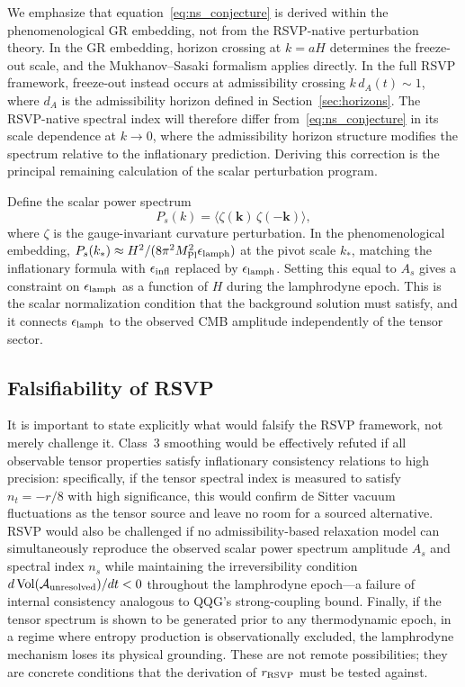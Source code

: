 \documentclass[12pt, a4paper]{article}
\newcommand{\calA}{\mathcal{A}}
\newcommand{\epslamph}{\epsilon_{\rm lamph}}
\newcommand{\rRSVP}{r_{\rm RSVP}}
\newcommand{\Vol}{\operatorname{Vol}}
\begin{document}
We emphasize that equation~\eqref{eq:ns_conjecture} is derived within the
phenomenological GR embedding, not from the RSVP-native perturbation theory. In
the GR embedding, horizon crossing at $k = aH$ determines the freeze-out scale,
and the Mukhanov--Sasaki formalism applies directly. In the full RSVP framework,
freeze-out instead occurs at admissibility crossing $k\,d_A(t) \sim 1$, where
$d_A$ is the admissibility horizon defined in Section~\ref{sec:horizons}. The
RSVP-native spectral index will therefore differ from~\eqref{eq:ns_conjecture}
in its scale dependence at $k \to 0$, where the admissibility horizon structure
modifies the spectrum relative to the inflationary prediction. Deriving this
correction is the principal remaining calculation of the scalar perturbation
program.

Define the scalar power spectrum
\begin{equation}
P_s(k) = \langle \zeta(\mathbf{k})\,\zeta(-\mathbf{k})\rangle,
\end{equation}
where $\zeta$ is the gauge-invariant curvature perturbation. In the
phenomenological embedding, $P_s(k_*) \approx H^2/(8\pi^2 M_{\rm Pl}^2
\epslamph)$ at the pivot scale $k_*$, matching the inflationary formula with
$\epsilon_{\rm infl}$ replaced by $\epslamph$. Setting this equal to $A_s$ gives
a constraint on $\epslamph$ as a function of $H$ during the lamphrodyne epoch.
This is the scalar normalization condition that the background solution must
satisfy, and it connects $\epslamph$ to the observed CMB amplitude independently
of the tensor sector.

\subsection{Falsifiability of RSVP}

It is important to state explicitly what would falsify the RSVP framework, not
merely challenge it. Class~3 smoothing would be effectively refuted if all
observable tensor properties satisfy inflationary consistency relations to high
precision: specifically, if the tensor spectral index is measured to satisfy
$n_t = -r/8$ with high significance, this would confirm de Sitter vacuum
fluctuations as the tensor source and leave no room for a sourced alternative.
RSVP would also be challenged if no admissibility-based relaxation model can
simultaneously reproduce the observed scalar power spectrum amplitude $A_s$ and
spectral index $n_s$ while maintaining the irreversibility condition
$d\Vol(\calA_{\rm unresolved})/dt < 0$ throughout the lamphrodyne epoch---a failure
of internal consistency analogous to QQG's strong-coupling bound. Finally, if the
tensor spectrum is shown to be generated prior to any thermodynamic epoch, in a
regime where entropy production is observationally excluded, the lamphrodyne
mechanism loses its physical grounding. These are not remote possibilities; they
are concrete conditions that the derivation of $\rRSVP$ must be tested against.
\end{document}
